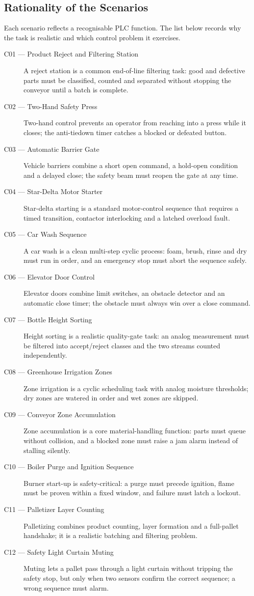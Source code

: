 \subsection{Rationality of the Scenarios}
Each scenario reflects a recognisable PLC function. The list below records why the task is realistic and which control problem it exercises.

\begin{description}
\item[C01 --- Product Reject and Filtering Station] A reject station is a common end-of-line filtering task: good and defective parts must be classified, counted and separated without stopping the conveyor until a batch is complete.
\item[C02 --- Two-Hand Safety Press] Two-hand control prevents an operator from reaching into a press while it closes; the anti-tiedown timer catches a blocked or defeated button.
\item[C03 --- Automatic Barrier Gate] Vehicle barriers combine a short open command, a hold-open condition and a delayed close; the safety beam must reopen the gate at any time.
\item[C04 --- Star-Delta Motor Starter] Star-delta starting is a standard motor-control sequence that requires a timed transition, contactor interlocking and a latched overload fault.
\item[C05 --- Car Wash Sequence] A car wash is a clean multi-step cyclic process: foam, brush, rinse and dry must run in order, and an emergency stop must abort the sequence safely.
\item[C06 --- Elevator Door Control] Elevator doors combine limit switches, an obstacle detector and an automatic close timer; the obstacle must always win over a close command.
\item[C07 --- Bottle Height Sorting] Height sorting is a realistic quality-gate task: an analog measurement must be filtered into accept/reject classes and the two streams counted independently.
\item[C08 --- Greenhouse Irrigation Zones] Zone irrigation is a cyclic scheduling task with analog moisture thresholds; dry zones are watered in order and wet zones are skipped.
\item[C09 --- Conveyor Zone Accumulation] Zone accumulation is a core material-handling function: parts must queue without collision, and a blocked zone must raise a jam alarm instead of stalling silently.
\item[C10 --- Boiler Purge and Ignition Sequence] Burner start-up is safety-critical: a purge must precede ignition, flame must be proven within a fixed window, and failure must latch a lockout.
\item[C11 --- Palletizer Layer Counting] Palletizing combines product counting, layer formation and a full-pallet handshake; it is a realistic batching and filtering problem.
\item[C12 --- Safety Light Curtain Muting] Muting lets a pallet pass through a light curtain without tripping the safety stop, but only when two sensors confirm the correct sequence; a wrong sequence must alarm.
\end{description}

